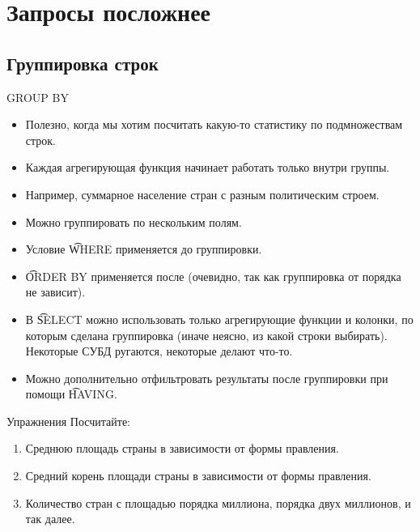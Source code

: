 \section{Запросы посложнее}
\begin{frame}
	\tableofcontents[currentsection]
\end{frame}

\subsection{Группировка строк}

\begin{frame}{GROUP BY}
	\begin{itemize}
		\item Полезно, когда мы хотим посчитать какую-то статистику по подмножествам строк.
		\item Каждая агрегирующая функция начинает работать только внутри группы.
		\item Например, суммарное население стран с разным политическим строем.
		\item Можно группировать по нескольким полям.
		\item Условие \t{WHERE} применяется до группировки.
		\item \t{ORDER BY} применяется после (очевидно, так как группировка от порядка не зависит).
		\item В \t{SELECT} можно использовать только агрегирующие функции и колонки, по которым сделана группировка
			(иначе неясно, из какой строки выбирать).
			Некоторые СУБД ругаются, некоторые делают что-то.
		\item Можно дополнительно отфильтровать результаты после группировки при помощи \t{HAVING}.
	\end{itemize}
\end{frame}

\begin{frame}{Упражнения}
	Посчитайте:
	\begin{enumerate}
		\item Среднюю площадь страны в зависимости от формы правления.
		\item Средний корень площади страны в зависимости от формы правления.
		\item Количество стран с площадью порядка миллиона, порядка двух миллионов, и так далее.
	\end{enumerate}
\end{frame}
